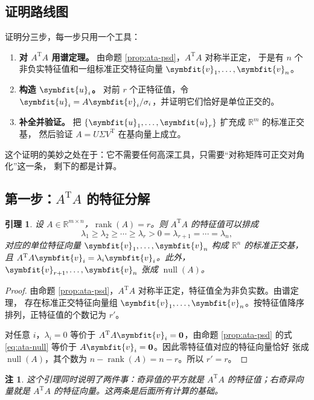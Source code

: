 \documentclass[UTF8, 11pt, a4paper, fontset=windows]{ctexart}
\theoremstyle{cnthm}
\newtheorem{lemma}[thm]{引理}
\theoremstyle{cndef}
\newtheorem{rem}[defn]{注}
\newcommand{\T}{^{\mathrm{T}}}
\newcommand{\R}{\mathbb{R}}
\DeclareMathOperator{\rank}{rank}
\DeclareMathOperator{\Null}{null}
\newcommand{\bu}{\symbfit{u}}
\newcommand{\vv}{\symbfit{v}}
\begin{document}
\subsection{证明路线图}

证明分三步，每一步只用一个工具：

\begin{enumerate}
  \item \textbf{对 $A\T A$ 用谱定理。} 由命题 \ref{prop:ata-psd}，$A\T A$ 对称半正定，
        于是有 $n$ 个非负实特征值和一组标准正交特征向量 $\vv_1,\dots,\vv_n$。
  \item \textbf{构造 $\bu_i$。} 对前 $r$ 个正特征值，令
        $\bu_i=A\vv_i/\sigma_i$，并证明它们恰好是单位正交的。
  \item \textbf{补全并验证。} 把 $\{\bu_1,\dots,\bu_r\}$ 扩充成 $\R^m$ 的标准正交基，
        然后验证 $A=U\Sigma V\T$ 在基向量上成立。
\end{enumerate}

这个证明的美妙之处在于：它不需要任何高深工具，只需要“对称矩阵可正交对角化”这一条，
剩下的都是计算。

\subsection{第一步：\texorpdfstring{$A\T A$}{AᵀA} 的特征分解}

\begin{lemma}\label{lem:eig}
设 $A\in\R^{m\times n}$，$\rank(A)=r$。则 $A\T A$ 的特征值可以排成
\begin{equation}
  \lambda_1\ge\lambda_2\ge\cdots\ge\lambda_r>0=\lambda_{r+1}=\cdots=\lambda_n ,
\end{equation}
对应的单位特征向量 $\vv_1,\dots,\vv_n$ 构成 $\R^n$ 的标准正交基，且
$A\T A\vv_i=\lambda_i\vv_i$。此外，$\vv_{r+1},\dots,\vv_n$ 张成 $\Null(A)$。
\end{lemma}

\begin{proof}
由命题 \ref{prop:ata-psd}，$A\T A$ 对称半正定，特征值全为非负实数。由谱定理，
存在标准正交特征向量组 $\vv_1,\dots,\vv_n$。按特征值降序排列，正特征值的个数记为 $r'$。

对任意 $i$，$\lambda_i=0$ 等价于 $A\T A\vv_i=\mathbf{0}$，由命题 \ref{prop:ata-psd}
的式 \eqref{eq:ata-null} 等价于 $A\vv_i=\mathbf{0}$。因此零特征值对应的特征向量恰好
张成 $\Null(A)$，其个数为 $n-\rank(A)=n-r$。所以 $r'=r$。
\end{proof}

\begin{rem}
这个引理同时说明了两件事：奇异值的平方就是 $A\T A$ 的特征值；右奇异向量就是
$A\T A$ 的特征向量。这两条是后面所有计算的基础。
\end{rem}
\end{document}
